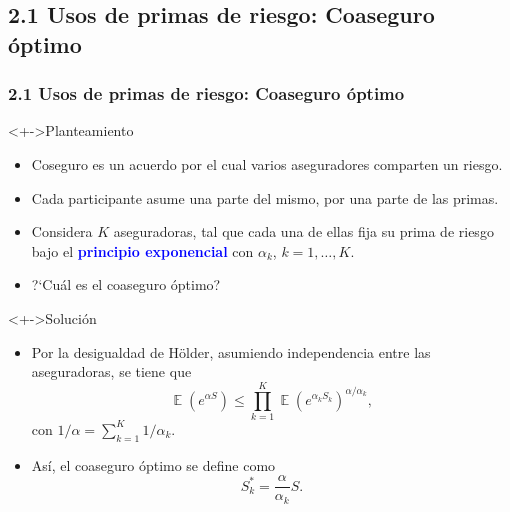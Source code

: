 \documentclass[cjk,t,compress]{beamer}
\newcommand{\field}[1]{\mathbb{#1}}
\newcommand{\expec}{\operatorname{\field{E}}}
\begin{document}
\subsection{2.1 Usos de primas de riesgo: Coaseguro \'optimo}
\begin{frame}[fragile]
	\frametitle{2.1 Usos de primas de riesgo: Coaseguro \'optimo}
	\scriptsize  	
		
		\vspace{0.1cm}
		\begin{block}<+->{Planteamiento}
		\vspace{0.3cm}
		\begin{itemize}
		 \item 
		 Coseguro es un acuerdo por el cual varios aseguradores comparten un riesgo.
		 
		 \item Cada participante asume una parte del mismo, por una parte de las primas. 
		 
		 \item Considera $K$ aseguradoras, tal que cada una de ellas fija su prima de riesgo bajo el \textcolor{blue}{\bf principio exponencial} con $\alpha_k$, $k=1,\ldots,K$.
		
		 \item \textcolor{MyDarkTerracota}{?`Cu\'al es el coaseguro \'optimo?}
		\end{itemize}
		\end{block}  		
				
		\vspace{0.1cm}
		\begin{block}<+->{Soluci\'on}
		\vspace{0.3cm}
		\begin{itemize}
		  \item Por la desigualdad de H\"older, asumiendo independencia entre las aseguradoras, se tiene que
		\begin{equation}
		\expec\left(e^{\alpha S}\right) \leq \prod_{k=1}^{K}\expec\left(e^{\alpha_k S_k}\right)^{\alpha/\alpha_k},
		\nonumber
		\end{equation}
		con $1/\alpha=\sum_{k=1}^{K}1/\alpha_k$.
		  \item As\'i, el coaseguro \'optimo se define como
		\begin{equation}
		S_{k}^{*}=\frac{\alpha}{\alpha_k}S.
		\nonumber
		\end{equation}
		\end{itemize}
		\end{block}  	
\end{frame}
\end{document}
